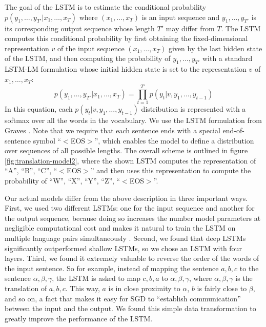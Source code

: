 \documentclass{article} \usepackage{nips14submit_e}
\begin{document}
The goal of the LSTM is to estimate the conditional probability
$p(y_1,\ldots,y_{T'} | x_1,\ldots,x_T)$ where $(x_1,\ldots,x_T)$ is an
input sequence and $y_1,\ldots,y_{T'}$ is its corresponding output
sequence whose length $T'$ may differ from $T$. The LSTM computes this
conditional probability by first obtaining the fixed-dimensional
representation $v$ of the input sequence $(x_1,\ldots,x_T)$ given by
the last hidden state of the LSTM, and then computing the probability
of $y_1,\ldots,y_{T'}$ with a standard LSTM-LM formulation whose
initial hidden state is set to the representation $v$ of
$x_1,\ldots,x_T$:
\begin{equation}
p(y_1,\ldots,y_{T'} | x_1,\ldots,x_T) = \prod_{t=1}^{T'} p(y_t | v, y_1, \ldots, y_{t-1})
\label{eqn:keyequation}
\end{equation}
In this equation, each $p(y_t | v, y_1, \ldots, y_{t-1})$ distribution
is represented with a softmax over all the words in the
vocabulary.  We use the LSTM formulation from Graves \cite{graves13c}.
Note that we require that each sentence ends with a special
end-of-sentence symbol ``$<$EOS$>$'', which enables the model to define a
distribution over sequences of all possible lengths. The overall
scheme is outlined in figure \ref{fig:translation-model2}, where the
shown LSTM computes the representation of ``A'', ``B'', ``C'', ``$<$EOS$>$''
and then uses this representation to compute the probability of ``W'',
``X'', ``Y'', ``Z'', ``$<$EOS$>$''.

Our actual models differ from the above description in three important
ways.  First, we used two different LSTMs: one for the input sequence
and another for the output sequence, because doing so increases the
number model parameters at negligible computational cost and makes it
natural to train the LSTM on multiple language pairs simultaneously
\cite{kal13}.  Second, we found that deep LSTMs significantly
outperformed shallow LSTMs, so we chose an LSTM with four layers.
Third, we found it extremely valuable to reverse the order of the
words of the input sentence. So for example, instead of mapping the
sentence $a,b,c$ to the sentence $\alpha, \beta, \gamma$, the LSTM is
asked to map $c,b,a$ to $\alpha, \beta, \gamma$, where $\alpha, \beta,
\gamma$ is the translation of $a,b,c$.  This way, $a$ is in close
proximity to $\alpha$, $b$ is fairly close to $\beta$, and so on, a
fact that makes it easy for SGD to ``establish communication'' between
the input and the output.  We found this simple data transformation to
greatly improve the performance of the LSTM.
\end{document}
